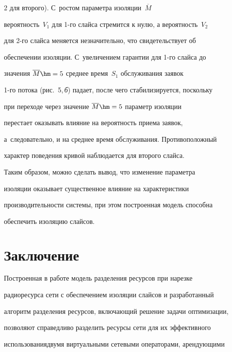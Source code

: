 \begin{multicols}{2}
для второго). С~ростом параметра изоляции~$\overline{M}$ 


вероятность~$V_1$ для 1-го слайса стремится к нулю, а вероятность~$V_2$ 


для 2-го слайса меняется незначительно, что свидетельствует об 


обеспечении изоляции. С~увеличением гарантии для 1-го слайса до 


значения $\overline{M}\hm=5$ среднее время~$S_1$ обслуживания заявок 


1-го потока (рис.~5,\,\textit{б}) падает, после чего стабилизируется, поскольку 


при переходе через значение $\overline{M}\hm=5$ параметр изоляции 


перестает оказывать влияние на вероятность приема заявок, 


а~следовательно, и на среднее время обслуживания. Противоположный 


характер поведения кривой наблюдается для второго слайса. 


  


  Таким образом, можно сделать вывод, что изменение параметра 


изоляции оказывает существенное влияние на характеристики 


про\-из\-во\-ди\-тель\-ности сис\-те\-мы, при этом построенная модель способна 


обеспечить изоляцию слайсов.





\vspace*{-10pt}


  


  \section{Заключение}


  


  Построенная в работе модель разделения ресурсов при нарезке 


радиоресурса сети с обеспечением изоляции слайсов и разработанный 


алгоритм разделения ресурсов, включающий решение задачи оптимизации, 


позволяют справедливо разделить ресурсы сети для их эффективного 


использования\linebreak двумя виртуальными сетевыми операторами, арендующими 



\end{multicols}
